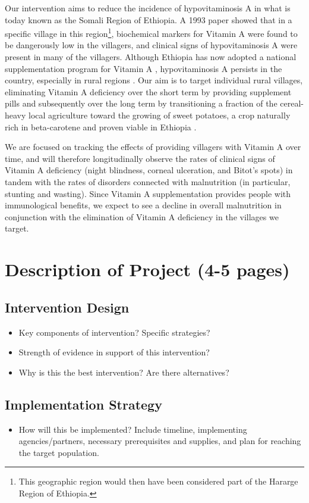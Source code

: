 \documentclass[12pt, letterpaper, draft]{article}
\begin{document}
Our intervention aims to reduce the incidence of hypovitaminosis A in what is today known as the Somali Region of Ethiopia. A 1993 paper \cite{wolde1993severe} showed that in a specific village in this region\footnote{This geographic region would then have been considered part of the Hararge Region of Ethiopia.}, biochemical markers for Vitamin A were found to be dangerously low in the villagers, and clinical signs of hypovitaminosis A were present in many of the villagers. Although Ethiopia has now adopted a national supplementation program for Vitamin A \cite{semba2008coverage}, hypovitaminosis A persists in the country, especially in rural regions \cite{demissie2010magnitude}. Our aim is to target individual rural villages, eliminating Vitamin A deficiency over the short term by providing supplement pills and subsequently over the long term by transitioning a fraction of the cereal-heavy local agriculture toward the growing of sweet potatoes, a crop naturally rich in beta-carotene and proven viable in Ethiopia \cite{belehu2003agronomical}. 

We are focused on tracking the effects of providing villagers with Vitamin A over time, and will therefore longitudinally observe the rates of clinical signs of Vitamin A deficiency (night blindness, corneal ulceration, and Bitot's spots) in tandem with the rates of disorders connected with malnutrition (in particular, stunting and wasting). Since Vitamin A supplementation provides people with immunological benefits, we expect to see a decline in overall malnutrition in conjunction with the elimination of Vitamin A deficiency in the villages we target.

\section{Description of Project (4-5 pages)}
\subsection{Intervention Design}
\begin{itemize}
    \item Key components of intervention? Specific strategies?
    \item Strength of evidence in support of this intervention?
    \item Why is this the best intervention? Are there alternatives?
\end{itemize}
\subsection{Implementation Strategy}
\begin{itemize}
    \item How will this be implemented? Include timeline, implementing agencies/partners,
    necessary prerequisites and supplies, and plan for reaching the target population.
\end{itemize}
\end{document}
